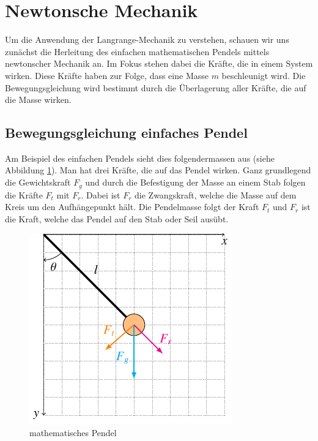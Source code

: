 \section{Newtonsche Mechanik}
Um die Anwendung der Langrange-Mechanik zu verstehen, schauen wir uns zunächst
die Herleitung des einfachen mathematischen Pendels mittels newtonscher Mechanik an.
Im Fokus stehen dabei die Kräfte, die in einem System wirken.
Diese Kräfte haben zur Folge, dass eine Masse \(m\) beschleunigt wird.
Die Bewegungsgleichung wird bestimmt durch die Überlagerung aller Kräfte, die auf
die Masse wirken.

\subsection{Bewegungsgleichung einfaches Pendel}
Am Beispiel des einfachen Pendels sieht dies folgendermassen aus
(siehe Abbildung \ref{fig:pendulum1}).
Man hat drei Kräfte, die auf das Pendel wirken.
Ganz grundlegend die Gewichtskraft \(F_g\) und durch die Befestigung der Masse
an einem Stab folgen die Kräfte \(F_t\) mit \(F_r\).
Dabei ist \(F_r\) die Zwangskraft, welche die Masse auf dem Kreis um
den Aufhängepunkt hält.
Die Pendelmasse folgt der Kraft \(F_t\) und \(F_r\) ist die Kraft, welche
das Pendel auf den Stab oder Seil ausübt.

\begin{figure}
    \centering
    \includegraphics{papers/doppelpendel/images/pendel_pic1.pdf}
    \caption{mathematisches Pendel}
    \label{fig:pendulum1}
\end{figure}

